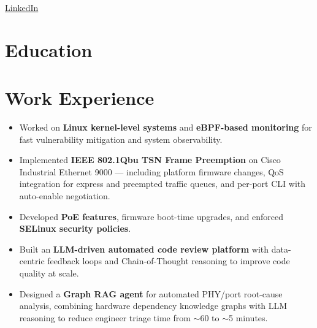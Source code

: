 \documentclass{resume}
\begin{document}
{\href{https://www.linkedin.com/in/rahul-verma-403060148/}{LinkedIn}}

\section{Education}

\section{Work Experience}

\begin{itemize}\setlength{\itemsep}{0pt}\setlength{\parskip}{0pt}
    \item Worked on \textbf{Linux kernel-level systems} and \textbf{eBPF-based monitoring} for fast vulnerability mitigation and system observability.
    \item Implemented \textbf{IEEE 802.1Qbu TSN Frame Preemption} on Cisco Industrial Ethernet 9000 --- including platform firmware changes, QoS integration for express and preempted traffic queues, and per-port CLI with auto-enable negotiation.
    \item Developed \textbf{PoE features}, firmware boot-time upgrades, and enforced \textbf{SELinux security policies}.
    \item Built an \textbf{LLM-driven automated code review platform} with data-centric feedback loops and Chain-of-Thought reasoning to improve code quality at scale.
    \item Designed a \textbf{Graph RAG agent} for automated PHY/port root-cause analysis, combining hardware dependency knowledge graphs with LLM reasoning to reduce engineer triage time from $\sim$60 to $\sim$5 minutes.
\end{itemize}
\end{document}
